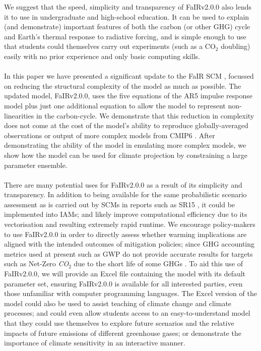 \documentclass[gmd, manuscript]{copernicus}
\begin{document}
We suggest that the speed, simplicity and transparency of FaIRv2.0.0 also lends it to use in undergraduate and high-school education. It can be used to explain (and demonstrate) important features of both the carbon (or other GHG) cycle and Earth's thermal response to radiative forcing, and is simple enough to use that students could themselves carry out experiments (such as a CO$_2$ doubling) easily with no prior experience and only basic computing skills.\\\\

%
\conclusions  %
In this paper we have presented a significant update to the FaIR SCM \citep{Smith2018}, focussed on reducing the structural complexity of the model as much as possible. The updated model, FaIRv2.0.0, uses the five equations of the AR5 impulse response model \citep{Myhre2013a} plus just one additional equation to allow the model to represent non-linearities in the carbon-cycle. We demonstrate that this reduction in complexity does not come at the cost of the model’s ability to reproduce globally-averaged observations or output of more complex models from CMIP6 \citep{Eyring2016}. After demonstrating the ability of the model in emulating more complex models, we show how the model can be used for climate projection by constraining a large parameter ensemble.\\\\
%
There are many potential uses for FaIRv2.0.0 as a result of its simplicity and transparency. In addition to being available for the same probabilistic scenario assessment as is carried out by SCMs in reports such as SR15 \citep{IPCC2018}, it could be implemented into IAMs; and likely improve computational efficiency due to its vectorisation and resulting extremely rapid runtime. We encourage policy-makers to use FaIRv2.0.0 in order to directly assess whether warming implications are aligned with the intended outcomes of mitigation policies; since GHG accounting metrics used at present such as GWP do not provide accurate results for targets such as Net-Zero \emph{CO$_2$} due to the short life of some GHGs \citep{Allen2018a}. To aid this use of FaIRv2.0.0, we will provide an Excel file containing the model with its default parameter set, ensuring FaIRv2.0.0 is available for all interested parties, even those unfamiliar with computer programming languages. The Excel version of the model could also be used to assist teaching of climate change and climate processes; and could even allow students access to an easy-to-understand model that they could use themselves to explore future scenarios and the relative impacts of future emissions of different greenhouse gases; or demonstrate the importance of climate sensitivity in an interactive manner.\\\\
\end{document}
